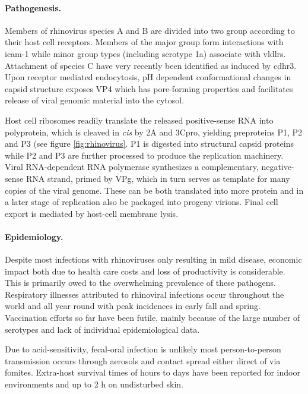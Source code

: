 \paragraph{Pathogenesis.}
Members of rhinovirus species A and B are divided into two group according to their host cell receptors. Members of the major group form interactions with \gls{icam-1} while minor group types (including serotype 1a) associate with \glspl{vldlr}. Attachment of species C have very recently been identified as induced by \gls{cdhr3}. Upon receptor mediated endocytosis, pH dependent conformational changes in capsid structure exposes VP4 which has pore-forming properties and facilitates release of viral genomic material into the cytosol.

Host cell ribosomes readily translate the released positive-sense RNA into polyprotein, which is cleaved in \textit{cis} by 2A and 3Cpro, yielding preproteins P1, P2 and P3 (see figure \ref{fig:rhinovirus}. P1 is digested into structural capsid proteins while P2 and P3 are further processed to produce the replication machinery. Viral RNA-dependent RNA polymerase synthesizes a complementary, negative-sense RNA strand, primed by VPg, which in turn serves as template for many copies of the viral genome. These can be both translated into more protein and in a later stage of replication also be packaged into progeny virions. Final cell export is mediated by host-cell membrane lysis.

\paragraph{Epidemiology.}
Despite most infections with rhinoviruses only resulting in mild disease, economic impact both due to health care costs and loss of productivity is considerable. This is primarily owed to the overwhelming prevalence of these pathogens. Respiratory illnesses attributed to rhinoviral infections occur throughout the world and all year round with peak incidences in early fall and spring. Vaccination efforts so far have been futile, mainly because of the large number of serotypes and lack of individual epidemiological data.

Due to acid-sensitivity, fecal-oral infection is unlikely most person-to-person transmission occurs through aerosols and contact spread either direct of via fomites. Extra-host survival times of hours to days have been reported for indoor environments and up to 2 h on undisturbed skin.

